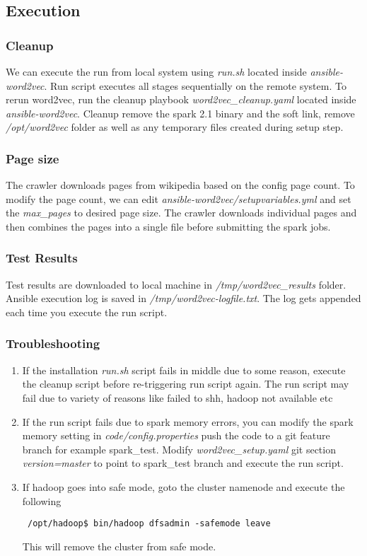 \subsection{Execution} \label{deploymentexecution}
\subsubsection{Cleanup}
We can execute the run from local system using  \textit{run.sh} located inside \textit{ansible-word2vec}. 
Run script executes all stages sequentially on the remote system. To rerun word2vec, run the cleanup 
playbook \textit{word2vec\_cleanup.yaml} located inside \textit{ansible-word2vec}.  Cleanup remove 
the spark 2.1 binary and the soft link, remove \textit{/opt/word2vec} folder as well as any temporary files created
during setup step.

\subsubsection{Page size}
The crawler downloads pages from wikipedia based on the config page count. To modify the page count, 
we can edit \textit{ansible-word2vec/setupvariables.yml} and set the \textit{max\_pages} to desired 
page size. The crawler downloads individual pages and then combines the pages into a single file
before submitting the spark jobs.

\subsubsection{Test Results}
Test results are downloaded to local machine in  \textit{/tmp/word2vec\_results} folder. Ansible execution
log is saved in \textit{/tmp/word2vec-logfile.txt}. The log gets appended each time you execute the run 
script.

\subsubsection{Troubleshooting}
\begin{enumerate}
\item If the installation \textit{run.sh} script fails in middle due to some reason, execute the cleanup script
before re-triggering run script again. The run script may fail due to variety of reasons like failed to shh,
hadoop not available etc
\item If the run script fails due to spark memory errors, you can modify the spark memory setting in
 \textit{code/config.properties} push the code to a git feature branch for example spark\_test. Modify
 \textit{word2vec\_setup.yaml} git section \textit{version=master} to point to spark\_test branch and 
 execute the run script.
 \item If hadoop goes into safe mode, goto the cluster namenode and execute the following
 \begin{verbatim}
 /opt/hadoop$ bin/hadoop dfsadmin -safemode leave
 \end{verbatim}
 This will remove the cluster from safe mode.
 \end{enumerate}
 
 
 

